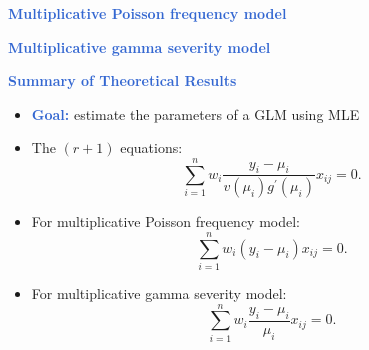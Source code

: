 \documentclass[aspectratio=169,professionalfonts,mathserif]{beamer}
\newcommand{\highlight}[1]{\textcolor{Highlight}{\bf #1}}
\renewcommand{\(}{\left(}
\renewcommand{\)}{\right)}
\renewcommand{\[}{\left[}
\renewcommand{\]}{\right]}
\newcommand{\mytitle}[1]{\vspace*{-1mm}%
  \centerline{\highlight{\Large #1}}\vspace*{3mm}}
\newenvironment{slidebox}{%
  \begin{minipage}[c][7.5cm][t]{14.4cm}\raggedright}{%
  \end{minipage}}
\begin{document}
\begin{frame}\begin{slidebox}
\mytitle{Multiplicative Poisson frequency model}

\end{slidebox}\end{frame}


\begin{frame}\begin{slidebox}
\mytitle{Multiplicative gamma severity model}

\end{slidebox}\end{frame}


\begin{frame}\begin{slidebox}
\mytitle{Summary of Theoretical Results}
\begin{itemize}
    \item \highlight{Goal:} estimate the parameters of a GLM using MLE
    \pause
    \item The $(r+1)$ equations:
    \begin{equation*}
      \sum_{i=1}^{n}w_{i}\frac{y_{i}-\mu_{i}}{v\left(  \mu_{i}\right)  g^{\prime
      }\left(  \mu_{i}\right)  }x_{ij}=0\text{.} 
    \end{equation*}
    \pause
    \item For multiplicative Poisson frequency model:
    \begin{equation*}
      \sum_{i=1}^{n}w_{i} (y_{i}-\mu_{i}) x_{ij} = 0 \text{.}
    \end{equation*}  
    \pause
    \item For multiplicative gamma severity model:
    \begin{equation*}
      \sum_{i=1}^{n}w_{i}\frac{y_{i}-\mu_{i}}{\mu_{i}}x_{ij}=0\text{.} 
    \end{equation*}
\end{itemize}
\end{slidebox}\end{frame}
\end{document}

